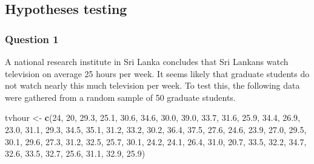 \documentclass[]{article}
\author{}
\date{\vspace{-2.5em}}
\newenvironment{Shaded}{\begin{snugshade}}{\end{snugshade}}
\newcommand{\DecValTok}[1]{\textcolor[rgb]{0.00,0.00,0.81}{#1}}
\newcommand{\FloatTok}[1]{\textcolor[rgb]{0.00,0.00,0.81}{#1}}
\newcommand{\KeywordTok}[1]{\textcolor[rgb]{0.13,0.29,0.53}{\textbf{#1}}}
\newcommand{\NormalTok}[1]{#1}
\newcommand{\StringTok}[1]{\textcolor[rgb]{0.31,0.60,0.02}{#1}}
\begin{document}
\hypertarget{hypotheses-testing}{%
\subsection{Hypotheses testing}\label{hypotheses-testing}}

\hypertarget{question-1}{%
\subsubsection{Question 1}\label{question-1}}

A national research institute in Sri Lanka concludes that Sri Lankans
watch television on average 25 hours per week. It seems likely that
graduate students do not watch nearly this much television per week. To
test this, the following data were gathered from a random sample of 50
graduate students.

\begin{Shaded}
\begin{Highlighting}[]
\NormalTok{tvhour <-}\StringTok{ }\KeywordTok{c}\NormalTok{(}\DecValTok{24}\NormalTok{, }\DecValTok{20}\NormalTok{, }\FloatTok{29.3}\NormalTok{, }\FloatTok{25.1}\NormalTok{, }\FloatTok{30.6}\NormalTok{, }\FloatTok{34.6}\NormalTok{, }\FloatTok{30.0}\NormalTok{, }\FloatTok{39.0}\NormalTok{, }\FloatTok{33.7}\NormalTok{, }\FloatTok{31.6}\NormalTok{, }
       \FloatTok{25.9}\NormalTok{, }\FloatTok{34.4}\NormalTok{, }\FloatTok{26.9}\NormalTok{, }\FloatTok{23.0}\NormalTok{, }\FloatTok{31.1}\NormalTok{, }\FloatTok{29.3}\NormalTok{, }\FloatTok{34.5}\NormalTok{, }\FloatTok{35.1}\NormalTok{, }\FloatTok{31.2}\NormalTok{, }\FloatTok{33.2}\NormalTok{, }
       \FloatTok{30.2}\NormalTok{, }\FloatTok{36.4}\NormalTok{, }\FloatTok{37.5}\NormalTok{, }\FloatTok{27.6}\NormalTok{, }\FloatTok{24.6}\NormalTok{, }\FloatTok{23.9}\NormalTok{, }\FloatTok{27.0}\NormalTok{, }\FloatTok{29.5}\NormalTok{, }\FloatTok{30.1}\NormalTok{, }\FloatTok{29.6}\NormalTok{, }
       \FloatTok{27.3}\NormalTok{, }\FloatTok{31.2}\NormalTok{, }\FloatTok{32.5}\NormalTok{, }\FloatTok{25.7}\NormalTok{, }\FloatTok{30.1}\NormalTok{, }\FloatTok{24.2}\NormalTok{, }\FloatTok{24.1}\NormalTok{, }\FloatTok{26.4}\NormalTok{, }\FloatTok{31.0}\NormalTok{, }\FloatTok{20.7}\NormalTok{, }
       \FloatTok{33.5}\NormalTok{, }\FloatTok{32.2}\NormalTok{, }\FloatTok{34.7}\NormalTok{, }\FloatTok{32.6}\NormalTok{, }\FloatTok{33.5}\NormalTok{, }\FloatTok{32.7}\NormalTok{, }\FloatTok{25.6}\NormalTok{, }\FloatTok{31.1}\NormalTok{, }\FloatTok{32.9}\NormalTok{, }\FloatTok{25.9}\NormalTok{)}
\end{Highlighting}
\end{Shaded}
\end{document}
